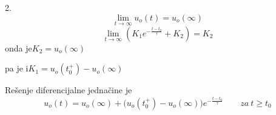 \begin{frame}[label=08-s052]
\setlength{\parskip}{2pt}
\setlength{\abovedisplayskip}{4pt}\setlength{\belowdisplayskip}{4pt}
2.
\[\lim_{t\to\infty}u_o(t)=u_o(\infty)\]
\[\lim_{t\to\infty}\left(K_1e^{-\frac{t-t_0}{\tau}}+K_2\right)=K_2\]
onda je\qquad $K_2=u_o(\infty)$\par
pa je i\qquad $K_1=u_o(t_0^+)-u_o(\infty)$\par\bigskip
Rešenje diferencijalne jednačine je
{\color{DEcrvena}\[u_o(t)=u_o(\infty)+\bigl(u_o(t_0^+)-u_o(\infty)\bigr)e^{-\frac{t-t_0}{\tau}}\qquad za\ t\geq t_0\]}
\end{frame}
